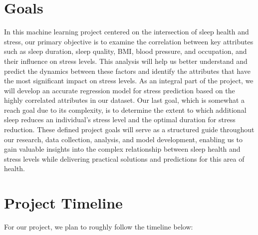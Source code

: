 \documentclass[11pt, letterpaper]{article}
\begin{document}
    
    \section*{Goals}
    In this machine learning project centered on the intersection of sleep health and stress, 
    our primary objective is to examine the correlation between key attributes such as sleep duration,
    sleep quality, BMI, blood pressure, and occupation, and their influence on stress levels. 
    This analysis will help us better understand and predict the dynamics between these factors and 
    identify the attributes that have the most significant impact on stress levels. 
    As an integral part of the project, we will develop an accurate regression model for stress prediction 
    based on the highly correlated attributes in our dataset. Our last goal, which is somewhat a reach goal 
    due to its complexity, is to determine the extent to which additional sleep reduces an individual's stress level 
    and the optimal duration for stress reduction. These defined project goals will serve as a structured guide 
    throughout our research, data collection, analysis, and model development, enabling us to gain valuable insights 
    into the complex relationship between sleep health and stress levels while delivering practical solutions and predictions for this area of health.

    \newpage

    \section*{Project Timeline}
    For our project, we plan to roughly follow the timeline below:
    
\end{document}
